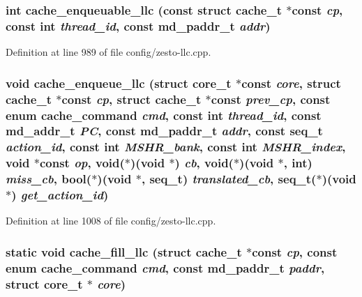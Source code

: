 \subsubsection[{cache\_\-enqueuable\_\-llc}]{\setlength{\rightskip}{0pt plus 5cm}int cache\_\-enqueuable\_\-llc (const struct {\bf cache\_\-t} $\ast$const  {\em cp}, \/  const int {\em thread\_\-id}, \/  const {\bf md\_\-paddr\_\-t} {\em addr})}\label{config_2zesto-llc_8cpp_17919e2800a0393570b40f08156cb42c}




Definition at line 989 of file config/zesto-llc.cpp.
\subsubsection[{cache\_\-enqueue\_\-llc}]{\setlength{\rightskip}{0pt plus 5cm}void cache\_\-enqueue\_\-llc (struct {\bf core\_\-t} $\ast$const  {\em core}, \/  struct {\bf cache\_\-t} $\ast$const  {\em cp}, \/  struct {\bf cache\_\-t} $\ast$const  {\em prev\_\-cp}, \/  const enum {\bf cache\_\-command} {\em cmd}, \/  const int {\em thread\_\-id}, \/  const {\bf md\_\-addr\_\-t} {\em PC}, \/  const {\bf md\_\-paddr\_\-t} {\em addr}, \/  const {\bf seq\_\-t} {\em action\_\-id}, \/  const int {\em MSHR\_\-bank}, \/  const int {\em MSHR\_\-index}, \/  void $\ast$const  {\em op}, \/  void($\ast$)(void $\ast$) {\em cb}, \/  void($\ast$)(void $\ast$, int) {\em miss\_\-cb}, \/  bool($\ast$)(void $\ast$, {\bf seq\_\-t}) {\em translated\_\-cb}, \/  {\bf seq\_\-t}($\ast$)(void $\ast$) {\em get\_\-action\_\-id})}\label{config_2zesto-llc_8cpp_6955e78ccb0fb1511754e8cd113e1dcc}




Definition at line 1008 of file config/zesto-llc.cpp.
\subsubsection[{cache\_\-fill\_\-llc}]{\setlength{\rightskip}{0pt plus 5cm}static void cache\_\-fill\_\-llc (struct {\bf cache\_\-t} $\ast$const  {\em cp}, \/  const enum {\bf cache\_\-command} {\em cmd}, \/  const {\bf md\_\-paddr\_\-t} {\em paddr}, \/  struct {\bf core\_\-t} $\ast$ {\em core})\hspace{0.3cm}{\tt  [inline, static]}}\label{config_2zesto-llc_8cpp_acfad7c90ec1f20c91ccfcae11d67dea}




